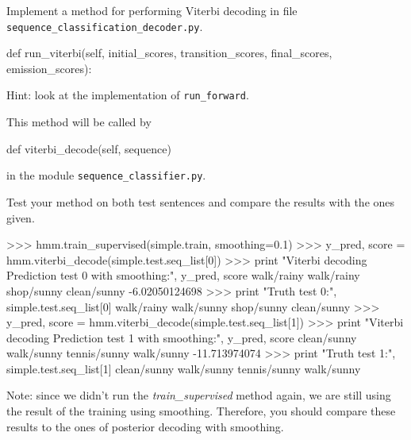 \begin{exercise}
Implement a method 
for performing Viterbi decoding in 
file {\tt sequence\_classification\_decoder.py}.
\begin{python}
        def run_viterbi(self, initial_scores, transition_scores, final_scores, emission_scores):
\end{python}
Hint: look at the implementation of 
{\tt run\_forward}.

This method will be called 
by 
\begin{python}
def viterbi_decode(self, sequence)
\end{python}
in the module {\tt sequence\_classifier.py}.
%

Test your method on both test sentences and compare the results with
the ones given.
\begin{python}
>>> hmm.train_supervised(simple.train, smoothing=0.1)
>>> y_pred, score = hmm.viterbi_decode(simple.test.seq_list[0])
>>> print "Viterbi decoding Prediction test 0 with smoothing:", y_pred, score
walk/rainy walk/rainy shop/sunny clean/sunny  -6.02050124698
>>> print "Truth test 0:", simple.test.seq_list[0]
walk/rainy walk/sunny shop/sunny clean/sunny 
>>> y_pred, score = hmm.viterbi_decode(simple.test.seq_list[1])
>>> print "Viterbi decoding Prediction test 1 with 
smoothing:", y_pred, score
clean/sunny walk/sunny tennis/sunny walk/sunny  -11.713974074
>>> print "Truth test 1:", simple.test.seq_list[1]
clean/sunny walk/sunny tennis/sunny walk/sunny 
\end{python}

Note: since we didn't run the \emph{train\_supervised} method again, we are still using the result of the training using smoothing. Therefore, you should compare these results to the ones of posterior decoding with smoothing.

\end{exercise}




